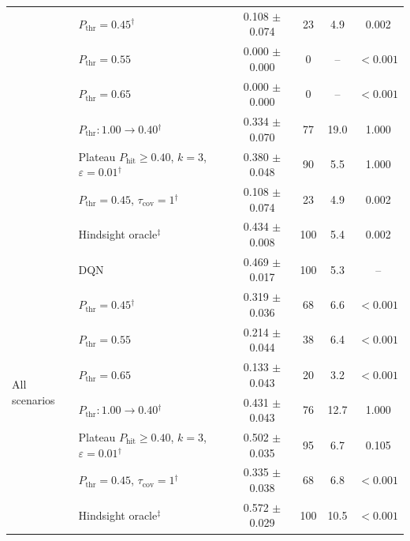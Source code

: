 \begin{table}[htbp]
\begin{tabular}{llcccc}
 & $P_{\mathrm{thr}}=0.45$$^{\dagger}$ & 0.108 $\pm$ 0.074 & 23 & 4.9 & 0.002 \\
 & $P_{\mathrm{thr}}=0.55$ & 0.000 $\pm$ 0.000 & 0 & -- & $<0.001$ \\
 & $P_{\mathrm{thr}}=0.65$ & 0.000 $\pm$ 0.000 & 0 & -- & $<0.001$ \\
 & $P_{\mathrm{thr}}: 1.00 \to 0.40$$^{\dagger}$ & 0.334 $\pm$ 0.070 & 77 & 19.0 & 1.000 \\
 & Plateau $P_{\mathrm{hit}}\geq0.40$, $k=3$, $\varepsilon=0.01$$^{\dagger}$ & 0.380 $\pm$ 0.048 & 90 & 5.5 & 1.000 \\
 & $P_{\mathrm{thr}}=0.45$, $\tau_{\mathrm{cov}}=1$$^{\dagger}$ & 0.108 $\pm$ 0.074 & 23 & 4.9 & 0.002 \\
 & Hindsight oracle$^{\ddagger}$ & 0.434 $\pm$ 0.008 & 100 & 5.4 & 0.002 \\
\midrule
\multirow{8}{*}{All scenarios} & DQN & 0.469 $\pm$ 0.017 & 100 & 5.3 & -- \\
 & $P_{\mathrm{thr}}=0.45$$^{\dagger}$ & 0.319 $\pm$ 0.036 & 68 & 6.6 & $<0.001$ \\
 & $P_{\mathrm{thr}}=0.55$ & 0.214 $\pm$ 0.044 & 38 & 6.4 & $<0.001$ \\
 & $P_{\mathrm{thr}}=0.65$ & 0.133 $\pm$ 0.043 & 20 & 3.2 & $<0.001$ \\
 & $P_{\mathrm{thr}}: 1.00 \to 0.40$$^{\dagger}$ & 0.431 $\pm$ 0.043 & 76 & 12.7 & 1.000 \\
 & Plateau $P_{\mathrm{hit}}\geq0.40$, $k=3$, $\varepsilon=0.01$$^{\dagger}$ & 0.502 $\pm$ 0.035 & 95 & 6.7 & 0.105 \\
 & $P_{\mathrm{thr}}=0.45$, $\tau_{\mathrm{cov}}=1$$^{\dagger}$ & 0.335 $\pm$ 0.038 & 68 & 6.8 & $<0.001$ \\
 & Hindsight oracle$^{\ddagger}$ & 0.572 $\pm$ 0.029 & 100 & 10.5 & $<0.001$ \\
\bottomrule
\end{tabular}
\end{table}
